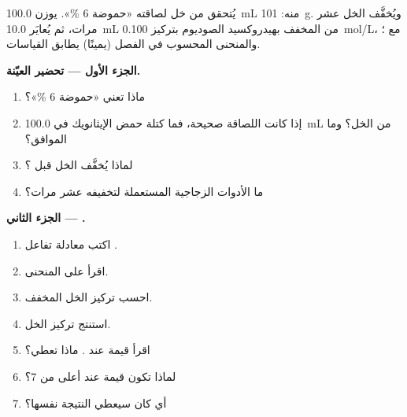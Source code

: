 \begin{problem}
\label{pb:g12:ph-conductivity-titrations:1}
يُتحقق من خل لصاقته «حموضة 6 \%». يوزن \qty{100.0}{mL}
منه: \qty{101}{g}. ويُخفَّف الخل عشر مرات، ثم
يُعايَر \qty{10.0}{mL} من  المخفف بهيدروكسيد الصوديوم
بتركيز \qty{0.100}{mol/L}، مع ؛ والمنحنى المحسوب في
الفصل (يمينًا) يطابق القياسات.

\medskip
\noindent\textbf{الجزء الأول --- تحضير العيّنة.}
\begin{enumerate}
  \item ماذا تعني «حموضة 6 \%»؟
  \item إذا كانت اللصاقة صحيحة، فما كتلة حمض الإيثانويك في
        \qty{100.0}{mL} من الخل؟ وما 
        الموافق؟
  \item لماذا يُخفَّف الخل قبل ؟
  \item ما الأدوات الزجاجية المستعملة لتخفيفه عشر مرات؟
\end{enumerate}

\medskip
\noindent\textbf{الجزء الثاني --- .}
\begin{enumerate}[resume]
  \item اكتب معادلة تفاعل .
  \item اقرأ  على المنحنى.
  \item احسب تركيز الخل المخفف.
  \item استنتج تركيز الخل.
  \item اقرأ قيمة  عند . ماذا تعطي؟
  \item لماذا تكون قيمة  عند  أعلى من 7؟
  \item أي  كان سيعطي النتيجة نفسها؟
\end{enumerate}


\end{problem}
